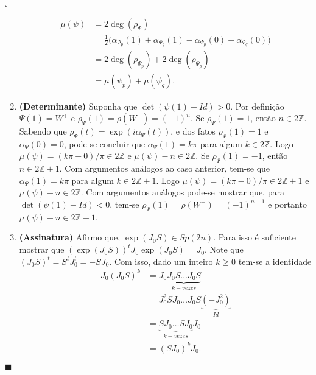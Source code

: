 \documentclass[12pt]{book}
\newenvironment{prova}[1]{$\square$ #1}{\hfill$\blacksquare$}
\newcommand{\estruturacomplexa}{J_{0}}
\newcommand{\gruposimpletico}[1]{Sp(#1)}
\newcommand{\inteiros}{\mathbb{Z}}
\begin{document}
\begin{prova}
\begin{enumerate}
			$$
			\begin{aligned}
			\mu(\psi) &= 2\deg(\rho_{\Psi}) 
			\\
			&= \frac{1}{2}\big(\alpha_{\Psi_{p}}(1)+\alpha_{\Psi_{q}}(1) -\alpha_{\Psi_{p}}(0)-\alpha_{\Psi_{q}}(0) \big) 
			\\
			&= 2\deg(\rho_{\Psi_{p}}) +2\deg(\rho_{\Psi_{p}}) 
			\\
			&=\mu(\psi_{p})+\mu(\psi_{q}).
			\end{aligned}
			$$
			
			\item \textbf{(Determinante)} Suponha que  $\det(\psi(1)- Id)>0$. Por definição $\Psi(1)=W^{+}$ e $\rho_{\Psi}(1) = \rho(W^{+}) = (-1)^{n}$. Se $\rho_{\Psi}(1) =1$, então $n\in 2\inteiros$. Sabendo que $\rho_{\Psi}(t) = \exp(i\alpha_{\Psi}(t))$, e dos fatos $\rho_{\Psi}(1) = 1$ e $\alpha_{\Psi}(0) = 0$, pode-se concluir que $\alpha_{\Psi}(1)=k\pi$ para algum $k \in 2\inteiros$. Logo $\mu(\psi) = (k\pi-0)/\pi \in 2\inteiros$ e $\mu(\psi)-n \in 2\inteiros$. Se $\rho_{\Psi}(1) =-1$, então $n\in 2\inteiros+1$. Com argumentos análogos ao caso anterior, tem-se que $\alpha_{\Psi}(1) = k\pi$ para algum $k\in 2\inteiros+1$. Logo $\mu(\psi) = (k\pi-0)/\pi \in 2\inteiros+1$ e $\mu(\psi)-n \in 2\inteiros$. Com argumentos análogos pode-se mostrar que, para $\det(\psi(1)- Id)<0$, tem-se  $\rho_{\Psi}(1) = \rho(W^{-}) = (-1)^{n-1}$ e portanto $\mu(\psi)-n \in 2\inteiros +1$.
			
			\item \textbf{(Assinatura)} Afirmo que, $\exp(\estruturacomplexa S) \in\gruposimpletico{2n}$. Para isso é suficiente mostrar que $(\exp(\estruturacomplexa S))^{t}\estruturacomplexa \exp(\estruturacomplexa S)= \estruturacomplexa$. Note que $(\estruturacomplexa S)^{t} 
			= S^{t}\estruturacomplexa^{t} = -S\estruturacomplexa$. Com isso, dado um inteiro $k\geq 0$ tem-se a identidade 
			$$
			\begin{aligned}
			\estruturacomplexa (\estruturacomplexa S)^{k} 
			&= \estruturacomplexa\underbrace{\estruturacomplexa  S\dots \estruturacomplexa S}_{k-vezes} 
			\\
			&= \estruturacomplexa^{2}  S\estruturacomplexa \dots \estruturacomplexa S \underbrace{(-\estruturacomplexa^{2})}_{Id} 
			\\
			&=\underbrace{ S\estruturacomplexa \dots  S \estruturacomplexa }_{k-vezes}\estruturacomplexa 
			\\
			&= (S\estruturacomplexa)^{k}\estruturacomplexa.
			\end{aligned}
			$$
			

\end{enumerate}
\end{prova}
\end{document}
